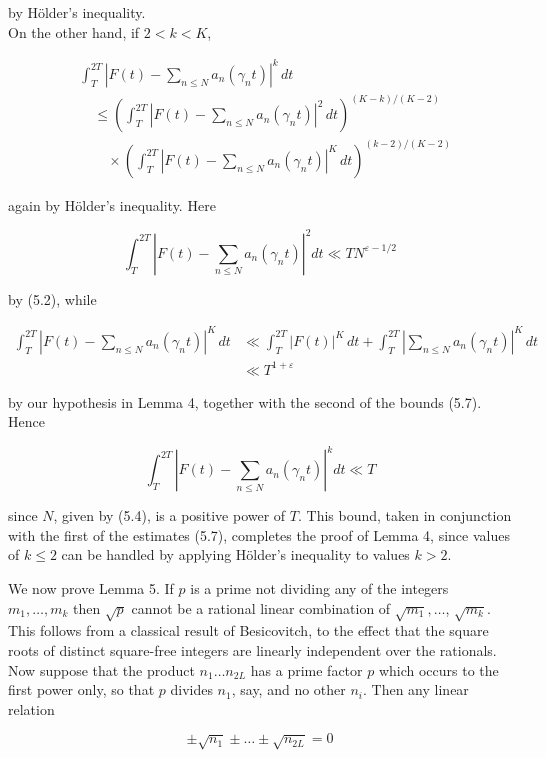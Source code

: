 \documentclass[10pt]{article}
\begin{document}
by Hölder's inequality.\\
On the other hand, if $2<k<K$,

$$
\begin{aligned}
&\int_{T}^{2T}\left|F(t)-\sum_{n \leq N}a_{n}\left(\gamma_{n}t\right)\right|^{k}\,dt \\
&\quad\leq\left(\int_{T}^{2T}\left|F(t)-\sum_{n \leq N}a_{n}\left(\gamma_{n}t\right)\right|^{2}\,dt\right)^{(K-k)/(K-2)} \\
&\qquad\times\left(\int_{T}^{2T}\left|F(t)-\sum_{n \leq N}a_{n}\left(\gamma_{n}t\right)\right|^{K}\,dt\right)^{(k-2)/(K-2)}
\end{aligned}
$$

again by Hölder's inequality. Here

$$
\int_{T}^{2 T}\left|F(t)-\sum_{n \leq N} a_{n}\left(\gamma_{n} t\right)\right|^{2} d t \ll T N^{\varepsilon-1 / 2}
$$

by (5.2), while

$$
\begin{aligned}
\int_{T}^{2T}\left|F(t)-\sum_{n \leq N}a_{n}\left(\gamma_{n}t\right)\right|^{K}\,dt
&\ll \int_{T}^{2T}|F(t)|^{K}\,dt
 +\int_{T}^{2T}\left|\sum_{n \leq N}a_{n}\left(\gamma_{n}t\right)\right|^{K}\,dt \\
&\ll T^{1+\varepsilon}
\end{aligned}
$$

by our hypothesis in Lemma 4, together with the second of the bounds (5.7). Hence

$$
\int_{T}^{2 T}\left|F(t)-\sum_{n \leq N} a_{n}\left(\gamma_{n} t\right)\right|^{k} d t \ll T
$$

since $N$, given by (5.4), is a positive power of $T$. This bound, taken in conjunction with the first of the estimates (5.7), completes the proof of Lemma 4, since values of $k \leq 2$ can be handled by applying Hölder's inequality to values $k>2$.

We now prove Lemma 5. If $p$ is a prime not dividing any of the integers $m_{1}, \ldots, m_{k}$ then $\sqrt{p}$ cannot be a rational linear combination of $\sqrt{m_{1}}, \ldots$, $\sqrt{m_{k}}$. This follows from a classical result of Besicovitch, to the effect that the square roots of distinct square-free integers are linearly independent over the rationals. Now suppose that the product $n_{1} \ldots n_{2 L}$ has a prime factor $p$ which occurs to the first power only, so that $p$ divides $n_{1}$, say, and no other $n_{i}$. Then any linear relation


\begin{equation*}
\pm \sqrt{n_{1}} \pm \ldots \pm \sqrt{n_{2 L}}=0 \tag{5.8}
\end{equation*}
\end{document}
